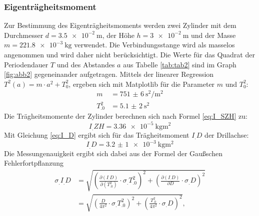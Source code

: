 \subsubsection{Eigenträgheitsmoment}\label{subsubsec:I_D}
Zur Bestimmung des Eigenträgheitsmoments werden zwei Zylinder mit dem Durchmesser $d = \SI{3,5e-2}{\metre}$, der Höhe $h = \SI{3e-2}{\metre}$ und der Masse $m = \SI{221,8e-3}{\kilogram}$ verwendet.\newline
Die Verbindungsstange wird als masselos angenommen und wird daher nicht berücksichtigt.
Die Werte für das Quadrat der Periodendauer $T$ und des Abstandes $a$ aus Tabelle \ref{tab:tab2} sind im Graph \ref{fig:abb2} gegeneinander aufgetragen. Mittels der linearer Regression $T^2(a) = m \cdot a^2 + T_0^2$, ergeben sich mit Matplotlib \cite{matplotlib} für die Parameter $m$ und $T_0^2$:
\begin{align*}
m 	   &= \SI{751(6)}{\second\squared\per\metre\squared} \\
T_.0^2 &= \SI{5,1(2)}{\second\squared}
\end{align*}
Die Trägheitsmomente der Zylinder berechnen sich nach Formel \eqref{eq:I_SZH} zu:
\[I_.{ZH}=\SI{3,36e-5}{\kilogram\metre\squared}\]
Mit Gleichung \eqref{eq:I_D} ergibt sich für das Trägheitsmoment $I_.D$ der Drillachse:
\[I_.D=\SI{3,2(1)e-3}{\kilogram\metre\squared}\]
Die Messungenauigkeit ergibt sich dabei aus der Formel der Gaußschen Fehlerfortpflanzung
\begin{align*}
\sigma_.{I_.D}	&= \sqrt{\left(\frac{\partial (I_.D)}{\partial (T^2_.0)} \cdot \sigma_.{T^2_.0}\right)^2+\left(\frac{\partial (I_.D)}{\partial D}\cdot\sigma_.D\right)^2}\\
				&= \sqrt{\left(\frac{D}{4\pi^2}\cdot\sigma_.{T^2_.0}\right)^2+\left(\frac{T^2_.0}{4\pi^2}\cdot\sigma_.D\right)^2},
\end{align*}
